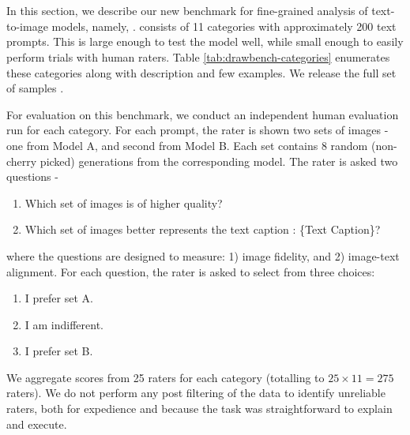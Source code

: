 \section{\benchmarkname}
\label{appendix:benchmark}

In this section, we describe our new benchmark for fine-grained analysis of text-to-image models, namely,  \benchmarkname. \benchmarkname consists of 11 categories with approximately 200 text prompts. This is large enough to test the model well, while small enough to easily perform trials with human raters. Table \ref{tab:drawbench-categories} enumerates these categories along with description and few examples. We release the full set of samples \href{https://docs.google.com/spreadsheets/d/1y7nAbmR4FREi6npB1u-Bo3GFdwdOPYJc617rBOxIRHY/edit#gid=0}{\color{blue}{here}}.

For evaluation on this benchmark, we conduct an independent human evaluation run for each category. For each prompt, the rater is shown two sets of images - one from Model A, and second from Model B. Each set contains 8 random (non-cherry picked)  generations from the corresponding model. The rater is asked two questions - 
\begin{enumerate}
    \item Which set of images is of higher quality?
    \item Which set of images better represents the text caption : \{Text Caption\}?
\end{enumerate}
where the questions are designed to measure: 1) image fidelity, and 2) image-text alignment. For each question, the rater is asked to select from three choices:
\begin{enumerate}
    \item I prefer set A.
    \item I am indifferent.
    \item I prefer set B.
\end{enumerate}

We aggregate scores from 25 raters for each category (totalling to $25 \times 11 = 275$ raters). We do not perform any post filtering of the data to identify unreliable raters, both for expedience and because the task was straightforward to explain and execute. 

